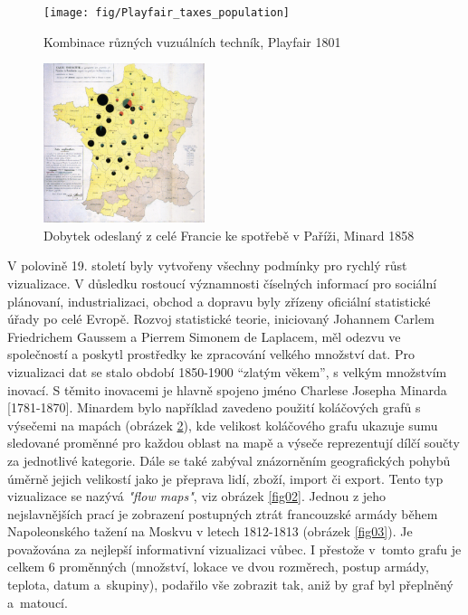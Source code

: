 \documentclass[12pt,]{article}
\begin{document}
\begin{figure}[H]

{\centering \texttt{[image: fig/Playfair\_taxes\_population]} 

}

\caption{\label{fig0} Kombinace různých vuzuálních techník, Playfair 1801}\label{fig:playfair}
\end{figure}

\newpage

\begin{figure}
    \centering
    \includegraphics[width=0.42\textwidth]{fig/Minard_1858}
    \vspace{-5pt}
    \caption{Dobytek odeslaný z celé Francie ke spotřebě v Paříži, Minard 1858}
    \label{fig01}
\end{figure}

\qquad V polovině 19. století byly vytvořeny všechny podmínky pro rychlý
růst vizualizace. V důsledku rostoucí významnosti číselných informací
pro sociální plánovaní, industrializaci, obchod a dopravu byly zřízeny
oficiální statistické úřady po celé Evropě. Rozvoj statistické teorie,
iniciovaný Johannem Carlem Friedrichem Gaussem a Pierrem Simonem de
Laplacem, měl odezvu ve společností a poskytl prostředky ke zpracování
velkého množství dat. Pro vizualizaci dat se stalo období 1850-1900
\enquote{zlatým věkem}, s velkým množstvím inovací. S těmito inovacemi
je hlavně spojeno jméno Charlese Josepha Minarda {[}1781-1870{]}.
Minardem bylo například zavedeno použití koláčových grafů s výsečemi na
mapách (obrázek \ref{fig01}), kde velikost koláčového grafu ukazuje sumu
sledované proměnné pro každou oblast na mapě a výseče reprezentují dílčí
součty za jednotlivé kategorie. Dále se také zabýval znázorněním
geografických pohybů úměrně jejich velikostí jako je přeprava lidí,
zboží, import či export. Tento typ vizualizace se nazývá
\textit{"flow maps"}, viz obrázek \ref{fig02}. Jednou z jeho
nejslavnějších prací je zobrazení postupných ztrát francouzské armády
během Napoleonského tažení na Moskvu v letech 1812-1813 (obrázek
\ref{fig03}). Je považována za nejlepší informativní vizualizaci vůbec.
I přestože v~tomto grafu je celkem 6 proměnných (množství, lokace ve
dvou rozměrech, postup armády, teplota, datum a~skupiny), podařilo vše
zobrazit tak, aniž by graf byl přeplněný a~\mbox{matoucí.}
\end{document}
